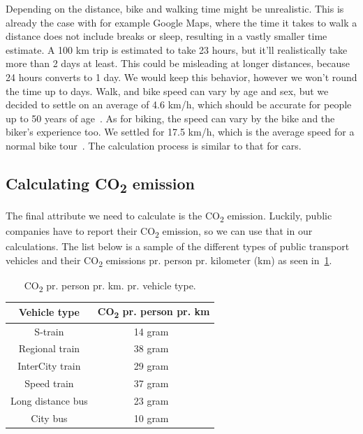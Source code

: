 Depending on the distance, bike and walking time might be unrealistic.
This is already the case with for example Google Maps, where the time it takes to walk a distance does not include
breaks or sleep, resulting in a vastly smaller time estimate.
A 100 km trip is estimated to take 23 hours, but it'll realistically take more than 2 days at least.
This could be misleading at longer distances, because 24 hours converts to 1 day.
We would keep this behavior, however we won't round the time up to days.
Walk, and bike speed can vary by age and sex, but we decided to settle on an average of 4.6 km/h, which should be
accurate for people up to 50 years of age~\cite{time_walk}.
As for biking, the speed can vary by the bike and the biker's experience too.
We settled for 17.5 km/h, which is the average speed for a normal bike tour~\cite{time_bike}.
The calculation process is similar to that for cars.

\subsection{Calculating \unit{CO_{2}} emission}\label{subsec:calculating-co2-emission}

The final attribute we need to calculate is the \unit{CO_{2}} emission.
Luckily, public companies have to report their \unit{CO_{2}} emission, so we can use that in our calculations.
The list below is a sample of the different types of public transport vehicles and their \unit{CO_{2}} emissions pr.
person pr. kilometer (km) as seen in~\ref{tab:emissions}.

\begin{table}[H]
    \centering
    \begin{tabular}{ || c | c || }
        \hline
        Vehicle type & \unit{CO_{2}} pr. person pr. km \\
        \hline\hline
        S-train & 14 gram~\cite{dsb2023} \\
        \hline
        Regional train & 38 gram~\cite{dsb2023} \\
        \hline
        InterCity train & 29 gram~\cite{dsb2023} \\
        \hline
        Speed train & 37 gram~\cite{dsb2023} \\
        \hline
        Long distance bus & 23 gram~\cite{cowi2022} \\
        \hline
        City bus & 10 gram~\cite{ntm2023} \\
        \hline
    \end{tabular}
    \caption{\unit{CO_{2}} pr. person pr. km. pr. vehicle type.}
    \label{tab:emissions}
\end{table}

